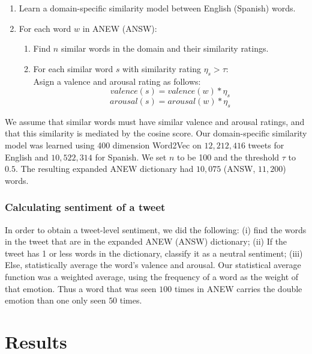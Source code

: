 \documentclass[11pt]{article}
\begin{document}
\begin{enumerate}
	\item Learn a domain-specific similarity model between English (Spanish) words.
	\item For each word $w$ in ANEW (ANSW):
	\begin{enumerate}
	 	\item Find $n$ similar words in the domain and their similarity ratings.
	 	\item For each similar word $s$ with similarity rating $\eta_s > \tau$: \\
	 		  Asign a valence and arousal rating as follows:
		 		\[ valence(s) = valence(w) * \eta_s	\]
		 		\[ arousal(s) = arousal(w) * \eta_s	\]
	 \end{enumerate} 
\end{enumerate}

We assume that similar words must have similar valence and arousal ratings, and that this similarity is mediated by the cosine score. Our domain-specific similarity model was learned using 400 dimension Word2Vec \cite{mikolov2013distributed} on $12,212,416$ tweets for English and $10,522,314$ for Spanish. We set $n$ to be 100 and the threshold $\tau$ to $0.5$. The resulting expanded ANEW dictionary had $10,075$ (ANSW, $11,200$) words. 


\subsubsection{Calculating sentiment of a tweet}
In order to obtain a tweet-level sentiment, we did the following: (i) find the words in the tweet that are in the expanded ANEW (ANSW) dictionary; (ii) If the tweet has 1 or less words in the dictionary, classify it as a neutral sentiment; (iii) Else, statistically average the word's valence and arousal. Our statistical average function was a weighted average, using the frequency of a word as the weight of that emotion. Thus a word that was seen $100$ times in ANEW carries the double emotion than one only seen $50$ times. 

\section{Results}
\end{document}
